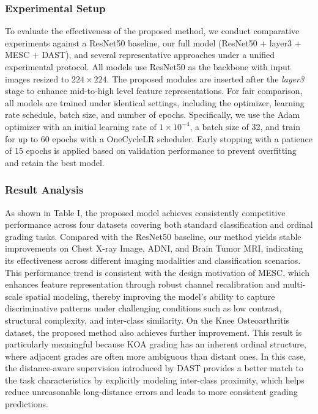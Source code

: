 \documentclass[letterpaper, 10 pt, conference]{ieeeconf}  %
\begin{document}
\subsubsection{Experimental Setup}
To evaluate the effectiveness of the proposed method, we conduct comparative experiments against a ResNet50 baseline, our full model (ResNet50 + layer3 + MESC + DAST), and several representative approaches under a unified experimental protocol. All models use ResNet50 as the backbone with input images resized to \(224 \times 224\). The proposed modules are inserted after the \textit{layer3} stage to enhance mid-to-high level feature representations. For fair comparison, all models are trained under identical settings, including the optimizer, learning rate schedule, batch size, and number of epochs. Specifically, we use the Adam optimizer with an initial learning rate of \(1\times10^{-4}\), a batch size of 32, and train for up to 60 epochs with a OneCycleLR scheduler. Early stopping with a patience of 15 epochs is applied based on validation performance to prevent overfitting and retain the best model.



\subsubsection{Result Analysis}
As shown in Table I, the proposed model achieves consistently competitive performance across four datasets covering both standard classification and ordinal grading tasks. Compared with the ResNet50 baseline, our method yields stable improvements on Chest X-ray Image, ADNI, and Brain Tumor MRI, indicating its effectiveness across different imaging modalities and classification scenarios. This performance trend is consistent with the design motivation of MESC, which enhances feature representation through robust channel recalibration and multi-scale spatial modeling, thereby improving the model’s ability to capture discriminative patterns under challenging conditions such as low contrast, structural complexity, and inter-class similarity. On the Knee Osteoarthritis dataset, the proposed method also achieves further improvement. This result is particularly meaningful because KOA grading has an inherent ordinal structure, where adjacent grades are often more ambiguous than distant ones. In this case, the distance-aware supervision introduced by DAST provides a better match to the task characteristics by explicitly modeling inter-class proximity, which helps reduce unreasonable long-distance errors and leads to more consistent grading predictions.
\end{document}
